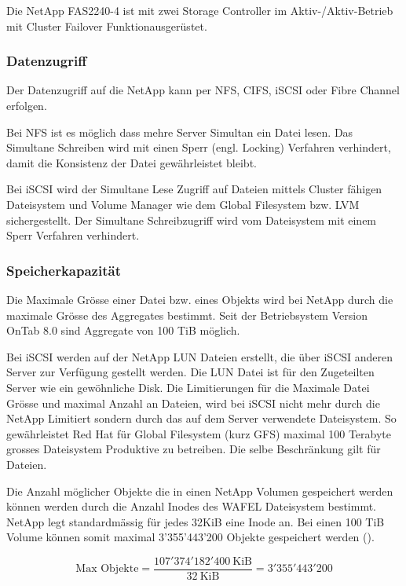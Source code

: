 Die NetApp FAS2240-4 ist mit zwei Storage Controller im Aktiv-/Aktiv-Betrieb mit Cluster Failover Funktionausgerüstet.


\subsubsection*{Datenzugriff}
Der Datenzugriff auf die NetApp kann per NFS, CIFS, iSCSI oder Fibre Channel erfolgen.

Bei NFS ist es möglich dass mehre Server Simultan ein Datei lesen. Das Simultane Schreiben wird mit einen Sperr (engl. Locking) Verfahren verhindert, damit die Konsistenz der Datei gewährleistet bleibt.

Bei iSCSI wird der Simultane Lese Zugriff auf Dateien mittels Cluster fähigen Dateisystem und Volume Manager wie dem Global Filesystem bzw. LVM sichergestellt. Der Simultane Schreibzugriff wird vom Dateisystem mit einem Sperr Verfahren verhindert.

\subsubsection*{Speicherkapazität}
Die Maximale Grösse einer Datei bzw. eines Objekts wird bei NetApp durch die maximale Grösse des Aggregates bestimmt. Seit der Betriebsystem Version OnTab 8.0 sind Aggregate von 100 TiB möglich.

Bei iSCSI werden auf der NetApp LUN Dateien erstellt, die über iSCSI anderen Server zur Verfügung gestellt werden. Die LUN Datei ist für den Zugeteilten Server wie ein gewöhnliche Disk. Die Limitierungen für die Maximale Datei Grösse und maximal Anzahl an Dateien, wird bei iSCSI nicht mehr durch die NetApp Limitiert sondern durch das auf dem Server verwendete Dateisystem. So gewährleistet Red Hat für Global Filesystem (kurz GFS) maximal 100 Terabyte grosses Dateisystem Produktive zu betreiben. Die selbe Beschränkung gilt für Dateien. 

Die Anzahl möglicher Objekte die in einen NetApp Volumen gespeichert werden können werden durch die Anzahl Inodes des WAFEL Dateisystem bestimmt. NetApp legt standardmässig für jedes 32KiB eine Inode an. Bei einen 100 TiB Volume können somit maximal 3'355'443'200 Objekte gespeichert werden ().

\begin{equation}
\mbox{Max Objekte} = \frac{107'374'182'400 \mathrm{\ KiB}}{32 \mathrm{\ KiB}}= 3'355'443'200 
\label{eqn:MaxObjekteNetApp}
\end{equation}

